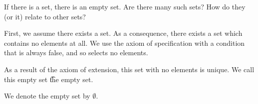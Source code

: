 

If there is a set, there is an empty set.
Are there many such sets?
How do they (or it) relate to other sets?


First, we assume there exists a set.
As a consequence, there exists a set which contains no elements at all.
We use the axiom of specification with a condition that is always false, and so selects no elements.

As a result of the axiom of extension, this set with no elements is unique.
We call this empty set \t{the empty set.}


We denote the empty set by $\emptyset$.
